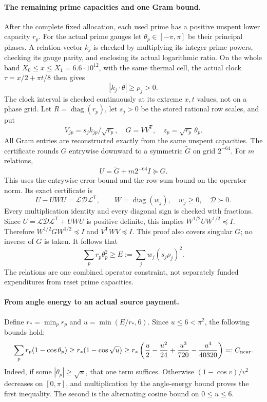 \documentclass[11pt,a4paper]{article}
\theoremstyle{definition}
\theoremstyle{remark}
\begin{document}
\paragraph{The remaining prime capacities and one Gram bound.}
After the complete fixed allocation, each used prime has a positive
unspent lower capacity $r_p$. For the actual prime gauges let
$\theta_p\in[-\pi,\pi]$ be their principal phases. A relation vector
$k_j$ is checked by multiplying its integer prime powers, checking its
gauge parity, and enclosing its actual logarithmic ratio. On the whole
band $X_0\le x\le X_1=6.6\cdot10^{12}$, with the same thermal cell,
the actual clock $\tau=x/2+\pi t/8$ then gives
\[
 |k_j\cdot\theta|\ge\rho_j>0.
\]
The clock interval is checked continuously at its extreme $x,t$ values,
not on a phase grid. Let $R=\operatorname{diag}(r_p)$, let $s_j>0$ be
the stored rational row scales, and put
\[
 V_{jp}=s_jk_{jp}/\sqrt{r_p},\quad G=VV^{\mathsf T},
 \quad z_p=\sqrt{r_p}\,\theta_p.
\]
All Gram entries are reconstructed exactly from the same unspent
capacities. The certificate rounds $G$ entrywise downward to a symmetric
$\widetilde G$ on grid $2^{-64}$. For $m$ relations,
\[
 U=\widetilde G+m2^{-64}I\succeq G.
\]
This uses the entrywise error bound and the row-sum bound on the
operator norm. Its exact certificate is
\[
 U-UWU=\mathcal L\mathcal D\mathcal L^{\mathsf T},
 \qquad W=\operatorname{diag}(w_j),\quad w_j\ge0,
 \quad\mathcal D\succ0.
\]
Every multiplication identity and every diagonal sign is checked with
fractions. Since $U=\mathcal L\mathcal D\mathcal L^{\mathsf T}+UWU$
is positive definite, this implies
$W^{1/2}UW^{1/2}\preceq I$. Therefore
$W^{1/2}GW^{1/2}\preceq I$ and $V^{\mathsf T}WV\preceq I$.
This proof also covers singular $G$; no inverse of $G$ is taken. It
follows that
\[
 \sum_pr_p\theta_p^2\ge
 E:=\sum_jw_j(s_j\rho_j)^2.
\]
The relations are one combined operator constraint, not separately
funded expenditures from reset prime capacities.

\paragraph{From angle energy to an actual source payment.}
Define $r_*=\min_pr_p$ and $u=\min(E/r_*,6)$. Since $u\leq6<\pi^2$,
the following bounds hold:
\begin{equation}
 \sum_pr_p(1-\cos\theta_p)
 \ge r_*(1-\cos\sqrt u)
 \ge r_*\left(\frac u2-\frac{u^2}{24}
                 +\frac{u^3}{720}-\frac{u^4}{40320}\right)=:C_{
 \rm near}.
 \label{eq:credit-cosine-envelope}
\end{equation}
Indeed, if some $|\theta_p|\ge\sqrt u$, that one term suffices.
Otherwise $(1-\cos v)/v^2$ decreases on $[0,\pi]$, and multiplication
by the angle-energy bound proves the first inequality. The second is
the alternating cosine bound on $0\le u\le6$.
\end{document}
